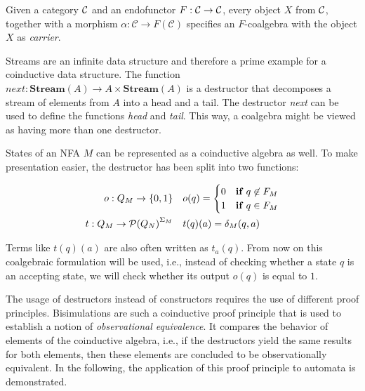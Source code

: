 \begin{definition}
    Given a category $\mathcal{C}$ and an endofunctor $F : \mathcal{C} \rightarrow \mathcal{C}$,
    every object $X$ from $\mathcal{C}$, together with a morphism
    $\alpha : \mathcal{C} \rightarrow F(\mathcal{C})$
    specifies an $F$-coalgebra with the object $X$ as \textit{carrier}.
\end{definition}

\begin{example}
    Streams are an infinite data structure and therefore
    a prime example for a coinductive data structure.
    The function
    $\textit{next} : \textbf{Stream}(A) \rightarrow A \times \textbf{Stream}(A)$
    is a destructor that decomposes a stream of elements from $A$ into a head and a tail.
    The destructor \textit{next} can be used to define the functions \textit{head} and \textit{tail}.
    This way, a coalgebra might be viewed as having more than one destructor.
\end{example}

\begin{example}
    States of an NFA $M$ can be represented as a coinductive algebra as well.
    To make presentation easier, the destructor has been split into two functions:

    \begin{align}
        o: Q_M \rightarrow \{0, 1\}\quad &o(q) =
            \begin{cases}
                0 & \textbf{if } q \not\in F_M\\
                1 & \textbf{if } q \in F_M
            \end{cases}\\
        t: Q_M \rightarrow {\mathcal{P}(Q_N)} ^{\Sigma_M} \quad & t(q)(a) = \delta_M(q, a)
    \end{align}

    Terms like $t(q)(a)$ are also often written as $t_a(q)$.
    From now on this coalgebraic formulation will be used, i.e.,
    instead of checking whether a state $q$ is an accepting state,
    we will check whether its output $o(q)$ is equal to $1$.
\end{example}

The usage of destructors instead of constructors requires the use of different proof principles.
Bisimulations are such a coinductive proof principle that is used to establish
a notion of \textit{observational equivalence}.
It compares the behavior of elements of the coinductive algebra,
i.e., if the destructors yield the same results for both elements, then these elements are concluded
to be observationally equivalent.
In the following, the application of this proof principle to automata is demonstrated.

